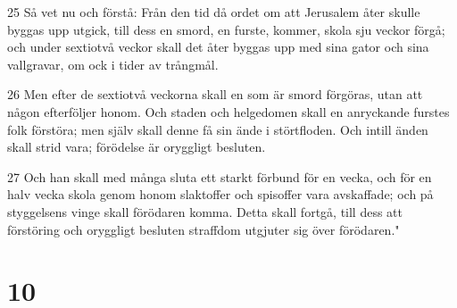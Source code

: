 \par 25 Så vet nu och förstå: Från den tid då ordet om att Jerusalem åter skulle byggas upp utgick, till dess en smord, en furste, kommer, skola sju veckor förgå; och under sextiotvå veckor skall det åter byggas upp med sina gator och sina vallgravar, om ock i tider av trångmål.
\par 26 Men efter de sextiotvå veckorna skall en som är smord förgöras, utan att någon efterföljer honom. Och staden och helgedomen skall en anryckande furstes folk förstöra; men själv skall denne få sin ände i störtfloden. Och intill änden skall strid vara; förödelse är oryggligt besluten.
\par 27 Och han skall med många sluta ett starkt förbund för en vecka, och för en halv vecka skola genom honom slaktoffer och spisoffer vara avskaffade; och på styggelsens vinge skall förödaren komma. Detta skall fortgå, till dess att förstöring och oryggligt besluten straffdom utgjuter sig över förödaren."

\chapter{10}

